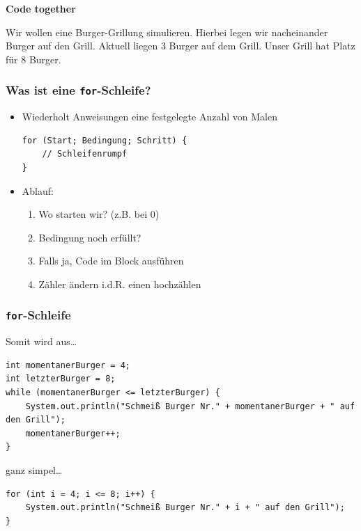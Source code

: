 \documentclass{../../presentation}
\begin{document}
\begin{frame}[plain]
    \vfill
    \centering
    {\Huge\bfseries Code together}

    \vspace{1cm}

    Wir wollen eine Burger-Grillung simulieren. Hierbei legen wir
    nacheinander Burger auf den Grill. Aktuell liegen 3 Burger auf
    dem Grill. Unser Grill hat Platz für 8 Burger.
    \vfill
\end{frame}

\begin{frame}[fragile]
	\frametitle{Was ist eine \texttt{for}-Schleife?}
	\pause
	\begin{itemize}
		\item Wiederholt Anweisungen eine festgelegte Anzahl von Malen
		      \pause
		      \begin{verbatim}
for (Start; Bedingung; Schritt) {
    // Schleifenrumpf
}
\end{verbatim}
		      \pause
		\item Ablauf:
		      \pause
		      \begin{enumerate}
			      \item Wo starten wir? (z.B. bei 0)
			            \pause
			      \item Bedingung noch erfüllt?
			            \pause
			      \item Falls ja, Code im Block ausführen
			            \pause
			      \item Zähler ändern i.d.R. einen hochzählen
		      \end{enumerate}
	\end{itemize}
\end{frame}

\begin{frame}[fragile]
	\frametitle{\texttt{for}-Schleife}
	\pause
	Somit wird aus\dots

	\begin{verbatim}
int momentanerBurger = 4;
int letzterBurger = 8;
while (momentanerBurger <= letzterBurger) {
    System.out.println("Schmeiß Burger Nr." + momentanerBurger + " auf den Grill");
    momentanerBurger++;
}
  \end{verbatim}
	\pause
	ganz simpel\dots
	\begin{verbatim}
for (int i = 4; i <= 8; i++) {
    System.out.println("Schmeiß Burger Nr." + i + " auf den Grill");
}
  \end{verbatim}

\end{frame}

\renewcommand{\feedbackurl}{\vkFeedbackUrlDayTwo}

\end{document}
